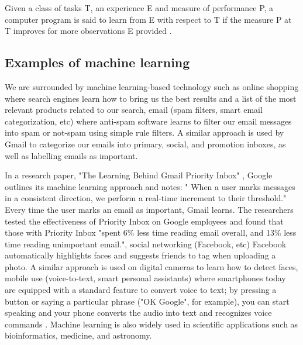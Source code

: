 Given a class of tasks T, an experience E and measure of performance P, a computer program is said to learn from E with respect to T if the measure P at T improves for more observations E provided \citep{michalski2013machine}. 
\subsection{Examples of machine learning}
We are surrounded by machine learning-based technology such as online shopping where  search engines learn how to bring us the best results and a list of the most relevant products related to our search, email (spam filters, smart email categorization, etc)  where anti-spam software
learns to filter our email messages into spam or not-spam using simple rule filters. A similar approach is used by Gmail to categorize our emails into primary, social, and promotion inboxes, as well as labelling emails as important. 

In a research paper, "The Learning Behind Gmail Priority Inbox" \citep{aberdeen2010learning}, Google outlines its machine learning approach  and notes: " When a user marks messages in a consistent direction, we perform a real-time increment to their threshold." Every time the user marks an email as important, Gmail learns. The researchers tested the effectiveness of Priority Inbox on Google employees and found that those with Priority Inbox "spent 6\% less time reading email overall, and 13\% less time reading unimportant email.", social networking (Facebook, etc) Facebook  automatically highlights faces and suggests friends to tag when uploading a photo. A similar approach is used on digital cameras to learn how to detect faces,  mobile use (voice-to-text, smart personal assistants)  where smartphones today are equipped with a standard feature to convert voice to text; by pressing a button or saying a particular phrase ("OK Google", for example), you can start speaking and your phone converts the audio into text and recognizes voice commands \citep{Techemergence}.  
Machine learning is also widely used in scientific applications such as bioinformatics, medicine, and astronomy.



